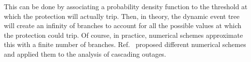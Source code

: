 

This can be done by associating a probability density function to the threshold at which the protection will actually trip. Then, in theory, the dynamic event tree will create an infinity of branches to account for all the possible values at which the protection could trip. Of course, in practice, numerical schemes approximate this with a finite number of branches. Ref.~\cite{TwoLevelPSA, Faghihi, PierreMCDETprelim} proposed different numerical schemes and applied them to the analysis of cascading outages.

